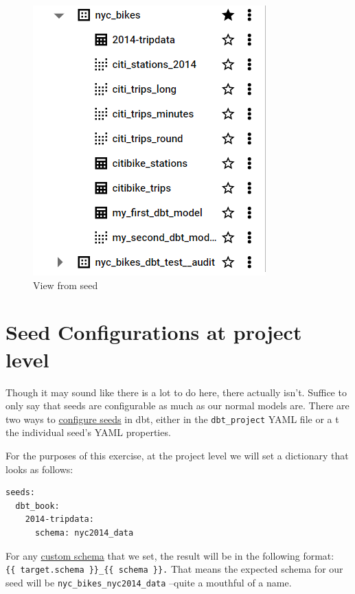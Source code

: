 \documentclass[
]{book}
\begin{document}
\begin{figure}
\centering
\includegraphics{./images/seed_view.png}
\caption{View from seed}
\end{figure}

\hypertarget{seed-configurations-at-project-level}{%
\section{Seed Configurations at project level}\label{seed-configurations-at-project-level}}

Though it may sound like there is a lot to do here, there actually isn't. Suffice to only say that seeds are configurable as much as our normal models are. There are two ways to \href{https://docs.getdbt.com/reference/seed-configs}{configure seeds} in dbt, either in the \texttt{dbt\_project} YAML file or a t the individual seed's YAML properties.

For the purposes of this exercise, at the project level we will set a dictionary that looks as follows:

\begin{verbatim}
seeds:
  dbt_book:
    2014-tripdata:
      schema: nyc2014_data
\end{verbatim}

For any \href{https://docs.getdbt.com/reference/resource-configs/schema}{custom schema} that we set, the result will be in the following format: \texttt{\{\{\ target.schema\ \}\}\_\{\{\ schema\ \}\}.} That means the expected schema for our seed will be \texttt{nyc\_bikes\_nyc2014\_data} --quite a mouthful of a name.
\end{document}
